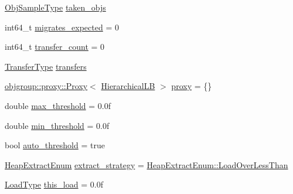 \begin{DoxyCompactItemize}
\item 
\hyperlink{structvt_1_1vrt_1_1collection_1_1lb_1_1_load_sampler_base_l_b_a8d939a849ec0d6371c1c4d441ffb9b94}{Obj\+Sample\+Type} \hyperlink{structvt_1_1vrt_1_1collection_1_1lb_1_1_hierarchical_l_b_a72831d31662a79dcb0cf5e1f9f2499dc}{taken\+\_\+objs}
\item 
int64\+\_\+t \hyperlink{structvt_1_1vrt_1_1collection_1_1lb_1_1_hierarchical_l_b_a79229451e82b523ca25e81c8249cc048}{migrates\+\_\+expected} = 0
\item 
int64\+\_\+t \hyperlink{structvt_1_1vrt_1_1collection_1_1lb_1_1_hierarchical_l_b_a858f07d19923904e7a8bb4a93c96041c}{transfer\+\_\+count} = 0
\item 
\hyperlink{structvt_1_1vrt_1_1collection_1_1lb_1_1_base_l_b_a0a5f834082d85c558bdaf84c464c1ead}{Transfer\+Type} \hyperlink{structvt_1_1vrt_1_1collection_1_1lb_1_1_hierarchical_l_b_ab9aad1307a83953ea436e1e3d865bbd0}{transfers}
\item 
\hyperlink{structvt_1_1objgroup_1_1proxy_1_1_proxy}{objgroup\+::proxy\+::\+Proxy}$<$ \hyperlink{structvt_1_1vrt_1_1collection_1_1lb_1_1_hierarchical_l_b}{Hierarchical\+LB} $>$ \hyperlink{structvt_1_1vrt_1_1collection_1_1lb_1_1_hierarchical_l_b_a116c56497faa79eff02d0f4b9932eba5}{proxy} = \{\}
\item 
double \hyperlink{structvt_1_1vrt_1_1collection_1_1lb_1_1_hierarchical_l_b_a14170b4d5e34cb45fd9e3ba08f6886cb}{max\+\_\+threshold} = 0.\+0f
\item 
double \hyperlink{structvt_1_1vrt_1_1collection_1_1lb_1_1_hierarchical_l_b_ab7ef9cc6d966759b3634d04427cab1b5}{min\+\_\+threshold} = 0.\+0f
\item 
bool \hyperlink{structvt_1_1vrt_1_1collection_1_1lb_1_1_hierarchical_l_b_a4f1e749384f8ae015ed1aabaa1b9a732}{auto\+\_\+threshold} = true
\item 
\hyperlink{namespacevt_1_1vrt_1_1collection_1_1lb_aeb0f47cf4b89bed7ea05462d0c2e5b5e}{Heap\+Extract\+Enum} \hyperlink{structvt_1_1vrt_1_1collection_1_1lb_1_1_hierarchical_l_b_a3bbe0e2597f6c01024f058d20ae9d26e}{extract\+\_\+strategy} = \hyperlink{namespacevt_1_1vrt_1_1collection_1_1lb_aeb0f47cf4b89bed7ea05462d0c2e5b5ea41a33133c182e43b9dfc2599f39eaa94}{Heap\+Extract\+Enum\+::\+Load\+Over\+Less\+Than}
\item 
\hyperlink{structvt_1_1vrt_1_1collection_1_1lb_1_1_base_l_b_a215e22b9f12678303f49615ae3be05cc}{Load\+Type} \hyperlink{structvt_1_1vrt_1_1collection_1_1lb_1_1_hierarchical_l_b_a5e1f0fa5a3806c5e02a5baf334c7fc37}{this\+\_\+load} = 0.\+0f
\end{DoxyCompactItemize}
